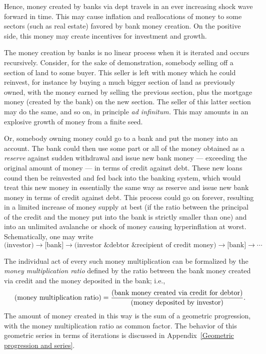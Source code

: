 \documentclass[aps,rmp,preprint,amsfonts,showpacs,showkeys]{revtex4}
\begin{document}
Hence, money created by banks via dept travels in an ever increasing shock wave forward in time.
This may cause inflation and reallocations of money to some sectors (such as real estate)
favored by bank money creation.
On the positive side, this money may create incentives for investment and growth.


The money creation by banks is no linear process when it is iterated and occurs recursively.
Consider, for the sake of demonstration, somebody selling off a section of land to some buyer.
This seller is left with money which he could reinvest, for instance by buying a much bigger section of land
as previously owned, with the money earned by selling the previous section, plus the mortgage money (created by
the bank) on the new section.
The seller of this latter section may do the same, and so on, in principle {\it ad infinitum.}
This may amounts in an explosive growth of money from a finite seed.

Or, somebody owning money could go to a bank and put the money into an account.
The bank could then use some part or all of the money obtained as a {\em reserve} against sudden withdrawal
and issue new bank money --- exceeding the original amount of money --- in terms of credit against debt.
These new loans cound then  be reinvested and fed back into the banking system, which would treat this new money
in essentially the same way as reserve and issue new bank money in terms of credit against debt.
This process could go on forever, resulting in a limited increase of money supply at best
(if the ratio between the principal of the credit and the money put into the bank is strictly smaller than one)
and into an unlimited avalanche or shock of money causing hyperinflation at worst.
Schematically, one may write
$$
\mbox{(investor)}
\rightarrow
\mbox{[bank]}
\rightarrow
\mbox{(investor \& debtor \& recipient of credit money)}\rightarrow
\mbox{[bank]}
\rightarrow  \cdots
$$

The individual act of every such money multiplication can be formalized by the {\em money multiplication ratio}
defined by the ratio between the bank money created via credit and the money deposited in the bank; i.e.,
$$
\mbox{(money multiplication ratio)}
=
{
\mbox{(bank money created via credit for debtor)}
\over
\mbox{(money deposited by investor)}
}
.
$$
The amount of money created in this way is the sum of a geometric progression,
with the money multiplication ratio as common factor.
The behavior of this geometric series in terms of iterations is discussed in Appendix~\ref{Geometric progression and series}.
\end{document}
